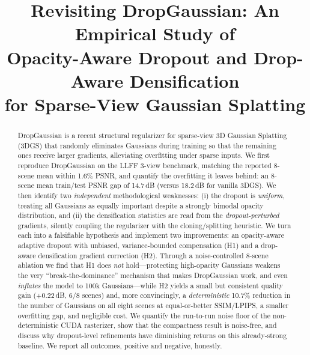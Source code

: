 \documentclass[conference]{IEEEtran}
\begin{document}
\title{Revisiting DropGaussian: An Empirical Study of\\
Opacity-Aware Dropout and Drop-Aware Densification\\
for Sparse-View Gaussian Splatting}

\author{
}

\maketitle

\begin{abstract}
DropGaussian is a recent structural regularizer for sparse-view 3D Gaussian
Splatting (3DGS) that randomly eliminates Gaussians during training so that the
remaining ones receive larger gradients, alleviating overfitting under sparse
inputs. We first reproduce DropGaussian on the LLFF 3-view benchmark, matching the
reported 8-scene mean within 1.6\% PSNR, and quantify the overfitting it leaves
behind: an 8-scene mean train/test PSNR gap of 14.7\,dB (versus 18.2\,dB for vanilla
3DGS). We then identify two \emph{independent} methodological weaknesses: (i) the
dropout is \emph{uniform}, treating all Gaussians as equally important despite a
strongly bimodal opacity distribution, and (ii) the densification statistics are
read from the \emph{dropout-perturbed} gradients, silently coupling the regularizer
with the cloning/splitting heuristic. We turn each into a falsifiable hypothesis and
implement two improvements: an opacity-aware adaptive dropout with unbiased,
variance-bounded compensation (H1) and a drop-aware densification gradient correction
(H2). Through a noise-controlled 8-scene ablation we find that H1 does \emph{not}
hold---protecting high-opacity Gaussians weakens the very ``break-the-dominance''
mechanism that makes DropGaussian work, and even \emph{inflates} the model to 100k
Gaussians---while H2 yields a small but consistent quality gain (+0.22\,dB, 6/8
scenes) and, more convincingly, a \emph{deterministic} 10.7\% reduction in the number
of Gaussians on all eight scenes at equal-or-better SSIM/LPIPS, a smaller overfitting
gap, and negligible cost. We quantify the run-to-run noise floor of the
non-deterministic CUDA rasterizer, show that the compactness result is noise-free,
and discuss why dropout-level refinements have diminishing returns on this
already-strong baseline. We report all outcomes, positive and negative, honestly.
\end{abstract}
\end{document}
